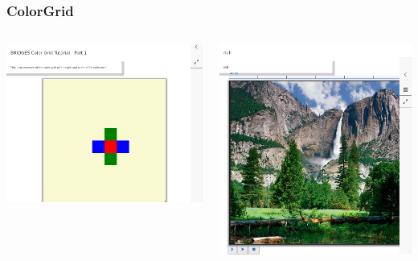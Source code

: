 \documentclass[aspectratio=169]{beamer}
\begin{document}
\begin{frame}
  \frametitle{ColorGrid}

  \begin{columns}
    \includegraphics[width=1.0\linewidth]{viz_figs/ColorGrid1.png}
    
    \includegraphics[width=1.0\linewidth]{viz_figs/ColorGrid2.png}


\end{columns}
\end{frame}
\end{document}
